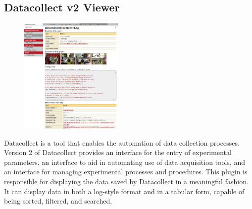 \documentclass[10pt]{article}
\begin{document}
\endgroup

\hfill\break
\hfill\break

\begingroup
\setlength\intextsep{0pt}
\subsection{Datacollect v2 Viewer}
\begin{figure}
		\includegraphics[width=0.45\textwidth]{Datacollect_v2_Viewer.png}
\end{figure}
Datacollect is a tool that enables the automation of data collection processes.  Version 2 of Datacollect provides an interface for the entry of experimental parameters, an interface to aid in automating use of data acquisition tools, and an interface for managing experimental processes and procedures.  This plugin is responsible for displaying the data saved by Datacollect in a meaningful fashion.  It can display data in both a log-style format and in a tabular form, capable of being sorted, filtered, and searched.

\endgroup

\hfill \break
\hfill \break
\hfill \break
\hfill \break
\hfill \break
\hfill \break
\hfill \break
\hfill \break
\hfill \break

\begingroup
\setlength\intextsep{0pt}
\end{document}
